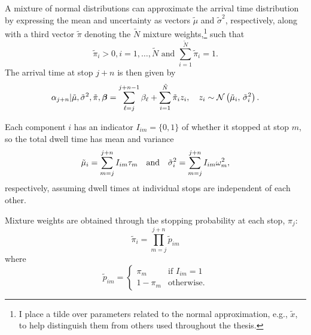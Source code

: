 A mixture of normal distributions can approximate the arrival time distribution \citep{Wang_2012} by expressing the mean and uncertainty as vectors $\tilde\mu$ and $\tilde\sigma^2$, respectively, along with a third vector $\tilde\pi$ denoting the $\tilde N$ mixture weights,\footnote{I place a tilde over parameters related to the normal approximation, e.g., $\tilde x$, to help distinguish them from others used throughout the thesis.} such that
\begin{equation}
\label{eq:ch5:mixture_weight_spec}
\tilde\pi_i > 0, i = 1, \ldots, \tilde N
\text{ and } \sum_{i=1}^{\tilde N} \tilde\pi_i = 1.
\end{equation}
The arrival time at stop $j + n$ is then given by
\begin{equation}
\label{eq:arrival_time_normal_approx}
\alpha_{j+n} | \tilde\mu, \tilde\sigma^2, \tilde\pi, \boldsymbol\beta =
\sum_{\ell=j}^{j+n-1} \beta_\ell +
\sum_{i=1}^{\tilde N} \tilde\pi_i z_i,\quad
z_i \sim \mathcal{N}\left(\tilde\mu_i,\, \tilde\sigma^2_i\right).
\end{equation}


Each component $i$ has an indicator $I_{im} = \{0,1\}$ of whether it stopped at stop $m$, so the total dwell time has mean and variance
\begin{equation}
\label{eq:mixture_dwell_times}
\tilde\mu_i = \sum_{m=j}^{j+n} I_{im} \tau_m\quad\text{and}\quad
\tilde\sigma_i^2 = \sum_{m=j}^{j+n} I_{im} \omega^2_m,
\end{equation}
respectively, assuming dwell times at individual stops are independent of each other.

Mixture weights are obtained through the stopping probability at each stop, $\pi_j$:
\begin{equation}
\label{eq:ch5:mixture_weights}
\tilde\pi_i = \prod_{m=j}^{j+n} \tilde p_{im}
\end{equation}
where
\begin{equation}
\label{eq:ch5:mixture_weights2}
\tilde p_{im} =
\begin{cases}
\pi_m & \text{if } I_{im} = 1 \\
1 - \pi_m & \text{otherwise.}
\end{cases}
\end{equation}


